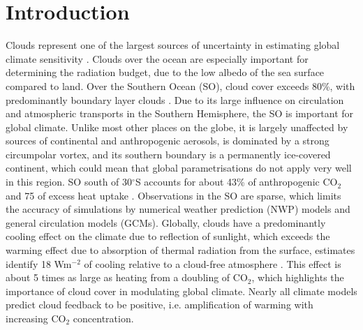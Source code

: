 \chapter{Introduction}

Clouds represent one of the largest sources of uncertainty in estimating global
climate sensitivity \citep{williams2017}. Clouds over the ocean
are especially important for determining the radiation budget, due to the
low albedo of the sea surface compared to land.
Over the Southern Ocean (SO),
cloud cover exceeds 80\%, with predominantly boundary layer clouds \citep{mace2009}.
Due to its large influence on circulation and atmospheric transports in the
Southern Hemisphere, the SO is important for global climate. Unlike
most other places on the globe, it is largely unaffected by sources of
continental and anthropogenic aerosols, is dominated by a strong circumpolar
vortex, and its southern boundary is a permanently ice-covered continent,
which could mean that global parametrisations do not apply very well in this
region.
SO south of 30$^\circ$S accounts for about 43\% of anthropogenic CO$_2$ and 75%
of excess heat uptake \citep{frolicher2015}.
Observations in the SO are sparse, which limits the accuracy
of simulations by numerical weather prediction (NWP) models and general
circulation models (GCMs).
Globally, clouds have a predominantly cooling effect on the climate due to reflection
of sunlight, which exceeds the warming effect due to absorption of thermal
radiation from the surface, estimates identify 18 Wm$^{-2}$ of cooling relative to a cloud-free atmosphere
\citep{zelinka2017}. This effect is about 5 times as large as heating from
a doubling of CO$_2$, which highlights the importance of cloud cover in modulating
global climate. Nearly all climate models predict cloud feedback to be positive,
i.e. amplification of warming with increasing CO$_2$ concentration.

